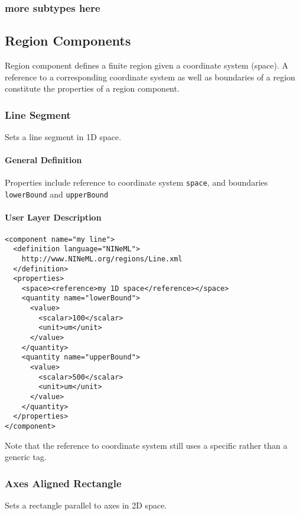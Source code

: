 \documentclass{article}
\begin{document}
\subsubsection{more subtypes here}

\subsection{Region Components}

Region component defines a finite region given a coordinate system (space). A reference to a
corresponding coordinate system as well as boundaries of a region constitute
the properties of a region component.

\subsubsection{Line Segment}

Sets a line segment in 1D space.

\paragraph{General Definition}
Properties include reference to coordinate system {\tt space}, and boundaries
{\tt lowerBound} and {\tt upperBound}

\paragraph{User Layer Description}
\begin{verbatim}
<component name="my line">
  <definition language="NINeML">
    http://www.NINeML.org/regions/Line.xml
  </definition>
  <properties>
    <space><reference>my 1D space</reference></space>
    <quantity name="lowerBound">
      <value>
        <scalar>100</scalar>
        <unit>um</unit>
      </value>
    </quantity>
    <quantity name="upperBound">
      <value>
        <scalar>500</scalar>
        <unit>um</unit>
      </value>
    </quantity>
  </properties>
</component>
\end{verbatim}
Note that the reference to coordinate system still uses a specific rather than a
generic tag.

\subsubsection{Axes Aligned Rectangle}

Sets a rectangle parallel to axes in 2D space.
\end{document}
